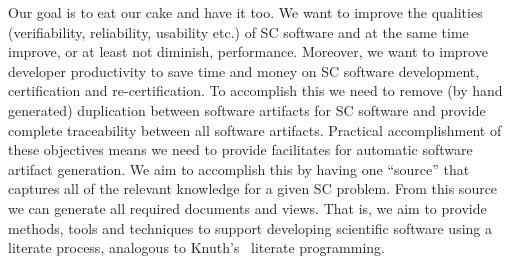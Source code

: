\documentclass{sig-alternate-05-2015}
\begin{document}


Our goal is to eat our cake and have it too.  We want to improve the qualities
(verifiability, reliability, usability etc.) of SC software and at the same time
improve, or at least not diminish, performance.  Moreover, we want to improve
developer productivity to save time and money on SC software development,
certification and re-certification.  To accomplish this we need to remove (by
hand generated) duplication between software artifacts for SC software
\cite{WilsonEtAl2013} and provide complete traceability between all software
artifacts.  Practical accomplishment of these objectives means we need to
provide facilitates for automatic software artifact generation.  We aim to
accomplish this by having one ``source'' that captures all of the relevant
knowledge for a given SC problem.  From this source we can generate all required
documents and views.  That is, we aim to provide methods, tools and techniques
to support developing scientific software using a literate process, analogous
to Knuth's~\cite{Knuth1984} literate programming.
\end{document}
